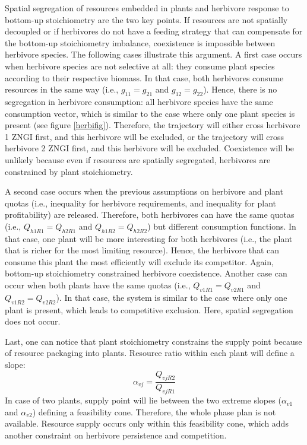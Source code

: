 \documentclass[12pt]{article}
\begin{document}
Spatial segregation of resources embedded in plants and herbivore response to bottom-up stoichiometry are the two key points. If resources are not spatially decoupled or if herbivores do not have a feeding strategy that can compensate for the bottom-up stoichiometry imbalance, coexistence is impossible between herbivore species. The following cases illustrate this argument. 
A first case occurs when herbivore species are not selective at all: they consume plant species according to their respective biomass. In that case, both herbivores consume resources in the same way (i.e., $g_{11}=g_{21}$ and $g_{12}=g_{22}$). Hence, there is no segregation in herbivore consumption: all herbivore species have the same consumption vector, which is similar to the case where only one plant species is present (see figure \ref{herbifig}). Therefore, the trajectory will either cross herbivore 1 ZNGI first, and this herbivore will be excluded, or the trajectory will cross herbivore 2 ZNGI first, and this herbivore will be excluded. %
Coexistence will be unlikely because even if resources are spatially segregated, herbivores are constrained by plant stoichiometry. \par
A second case occurs when the previous assumptions on herbivore and plant quotas (i.e., inequality for herbivore requirements, and inequality for plant profitability) are released. %
Therefore, both herbivores can have the same quotas (i.e., $Q_{h1R1}=Q_{h2R1}$ and $Q_{h1R2}=Q_{h2R2}$) but different consumption functions. In that case, one plant will be more interesting for both herbivores (i.e., the plant that is richer for the most limiting resource). Hence, the herbivore that can consume this plant the most efficiently will exclude its competitor. Again, bottom-up stoichiometry constrained herbivore coexistence. 
Another case can occur when both plants have the same quotas (i.e., $Q_{v1R1}=Q_{v2R1}$ and $Q_{v1R2}=Q_{v2R2}$). In that case, the system is similar to the case where only one plant is present, which leads to competitive exclusion. Here, spatial segregation does not occur. \par
Last, one can notice that plant stoichiometry constrains the supply point because of resource packaging into plants. 
Resource ratio within each plant will define a slope:
\begin{equation}
\alpha _{vj} = \frac{Q_{vjR2}}{Q_{vjR1}}
\end{equation}
In case of two plants, supply point will lie between the two extreme slopes ($\alpha _{v1}$ and $\alpha _{v2}$) defining a feasibility cone. Therefore, the whole phase plan is not available. Resource supply occurs only within this feasibility cone, which adds another constraint on herbivore persistence and competition. 
\end{document}
